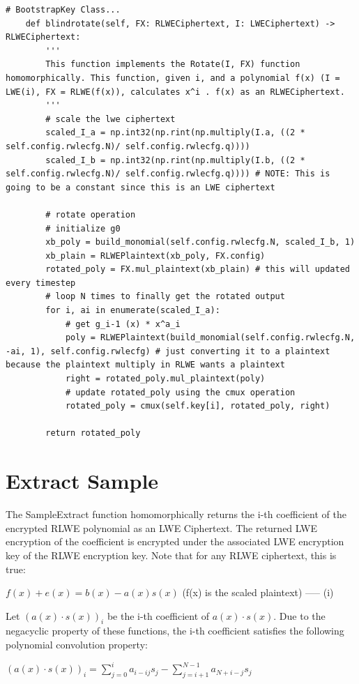\documentclass{report}
\begin{document}
\begin{verbatim}
# BootstrapKey Class...
	def blindrotate(self, FX: RLWECiphertext, I: LWECiphertext) -> RLWECiphertext:
		'''
		This function implements the Rotate(I, FX) function homomorphically. This function, given i, and a polynomial f(x) (I = LWE(i), FX = RLWE(f(x)), calculates x^i . f(x) as an RLWECiphertext.
		'''
		# scale the lwe ciphertext 
		scaled_I_a = np.int32(np.rint(np.multiply(I.a, ((2 * self.config.rwlecfg.N)/ self.config.rwlecfg.q)))) 
		scaled_I_b = np.int32(np.rint(np.multiply(I.b, ((2 * self.config.rwlecfg.N)/ self.config.rwlecfg.q)))) # NOTE: This is going to be a constant since this is an LWE ciphertext
		
		# rotate operation
		# initialize g0
		xb_poly = build_monomial(self.config.rwlecfg.N, scaled_I_b, 1)
		xb_plain = RLWEPlaintext(xb_poly, FX.config)        
		rotated_poly = FX.mul_plaintext(xb_plain) # this will updated every timestep
		# loop N times to finally get the rotated output
		for i, ai in enumerate(scaled_I_a):
			# get g_i-1 (x) * x^a_i
			poly = RLWEPlaintext(build_monomial(self.config.rwlecfg.N, -ai, 1), self.config.rwlecfg) # just converting it to a plaintext because the plaintext multiply in RLWE wants a plaintext
			right = rotated_poly.mul_plaintext(poly)
			# update rotated_poly using the cmux operation
			rotated_poly = cmux(self.key[i], rotated_poly, right)
		
		return rotated_poly
\end{verbatim}

\section{Extract Sample}
The SampleExtract function homomorphically returns the i-th coefficient of the encrypted RLWE polynomial as an LWE Ciphertext. The returned LWE encryption of the coefficient is encrypted under the associated LWE encryption key of the RLWE encryption key.  Note that for any RLWE ciphertext, this is true:
\begin{center}
	$f(x) + e(x) = b(x) - a(x)s(x)$ (f(x) is the scaled plaintext) ----- (i)
\end{center}
Let $( a(x) \cdot s(x))_i$ be the i-th coefficient of $a(x) \cdot s(x)$. Due to the negacyclic property of these functions, the i-th coefficient satisfies the following polynomial convolution property:
\begin{center}
	$( a(x) \cdot s(x))_i = \sum\limits_{j=0}^{i}a_{i-ij}s_j - \sum\limits_{j=i+1}^{N-1} a_{N+i-j} s_j$
\end{center}
\end{document}
